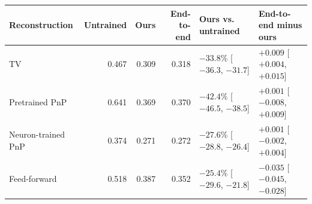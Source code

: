 \begin{tabular}{lrrrll}
\toprule
Reconstruction & Untrained & Ours & End-to-end & Ours vs. untrained & End-to-end minus ours \\
\midrule
TV & 0.467 & 0.309 & 0.318 & $-33.8\%$ [$-36.3$, $-31.7$] & $+0.009$ [$+0.004$, $+0.015$] \\
Pretrained PnP & 0.641 & 0.369 & 0.370 & $-42.4\%$ [$-46.5$, $-38.5$] & $+0.001$ [$-0.008$, $+0.009$] \\
Neuron-trained PnP & 0.374 & 0.271 & 0.272 & $-27.6\%$ [$-28.8$, $-26.4$] & $+0.001$ [$-0.002$, $+0.004$] \\
Feed-forward & 0.518 & 0.387 & 0.352 & $-25.4\%$ [$-29.6$, $-21.8$] & $-0.035$ [$-0.045$, $-0.028$] \\
\bottomrule
\end{tabular}
